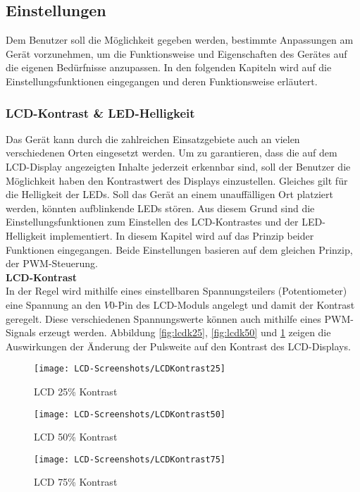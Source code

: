 \subsection{Einstellungen}
Dem Benutzer soll die Möglichkeit gegeben werden, bestimmte Anpassungen am Gerät vorzunehmen, um die Funktionsweise und Eigenschaften des Gerätes auf die eigenen Bedürfnisse anzupassen. In den folgenden Kapiteln wird auf die Einstellungsfunktionen eingegangen und deren Funktionsweise erläutert.
\subsubsection{LCD-Kontrast \& LED-Helligkeit}
Das Gerät kann durch die zahlreichen Einsatzgebiete auch an vielen verschiedenen Orten eingesetzt werden. Um zu garantieren, dass die auf dem LCD-Display angezeigten Inhalte jederzeit erkennbar sind, soll der Benutzer die Möglichkeit haben den Kontrastwert des Displays einzustellen. Gleiches gilt für die Helligkeit der LEDs. Soll das Gerät an einem unauffälligen Ort platziert werden, könnten aufblinkende LEDs stören. Aus diesem Grund sind die Einstellungsfunktionen zum Einstellen des LCD-Kontrastes und der LED-Helligkeit implementiert. In diesem Kapitel wird auf das Prinzip beider Funktionen eingegangen. Beide Einstellungen basieren auf dem gleichen Prinzip, der PWM-Steuerung. \\
\newline
\textbf{LCD-Kontrast}\\
In der Regel wird mithilfe eines einstellbaren Spannungsteilers (Potentiometer) eine Spannung an den $V0$-Pin des LCD-Moduls angelegt und damit der Kontrast geregelt. Diese verschiedenen Spannungswerte können auch mithilfe eines PWM-Signals erzeugt werden. Abbildung \ref{fig:lcdk25}, \ref{fig:lcdk50} und \ref{fig:lcdk75} zeigen die Auswirkungen der Änderung der Pulsweite auf den Kontrast des LCD-Displays. 
\begin{figure}[h]
	\begin{minipage}{.3\linewidth}
		\centering
		\texttt{[image: LCD-Screenshots/LCDKontrast25]}
		\caption{LCD 25\% Kontrast}
		\label{fig:lcdk25}
	\end{minipage}
	\hfill
	\begin{minipage}{.3\linewidth}
		\centering
		\texttt{[image: LCD-Screenshots/LCDKontrast50]}
		\caption{LCD 50\% Kontrast}
		\label{fig:lcdk50}
	\end{minipage}
	\hfill
	\begin{minipage}{.3\linewidth}
		\centering
		\texttt{[image: LCD-Screenshots/LCDKontrast75]}
		\caption{LCD 75\% Kontrast}
		\label{fig:lcdk75}
	\end{minipage}
	\hfill
\end{figure}
